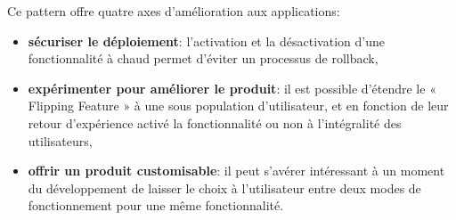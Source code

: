       Ce pattern offre quatre axes d'amélioration aux applications:\\

      \begin{itemize}
        \item \textbf{sécuriser le déploiement}: l'activation et la désactivation d'une fonctionnalité à chaud permet d'éviter un processus de rollback,
        \item \textbf{expérimenter pour améliorer le produit}: il est possible d'étendre le « Flipping Feature » à une sous population d'utilisateur, et en fonction de leur retour d'expérience activé la fonctionnalité ou non à l'intégralité des utilisateurs,
        \item \textbf{offrir un produit customisable}: il peut s'avérer intéressant à un moment du développement de laisser le choix à l'utilisateur entre deux modes de fonctionnement pour une même fonctionnalité.\\
      \end{itemize}
